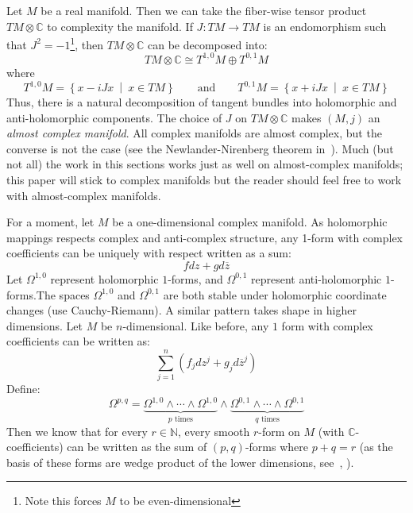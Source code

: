 \documentclass{book}
\newcommand{\N}{{\mathbb{N}}}
\newcommand{\C}{{\mathbb{C}}}
\newcommand{\set}[2]{\left\{#1 \ \middle|\ #2\right\}}
\begin{document}
Let $M$ be a real manifold. Then we can take the fiber-wise tensor product $TM\otimes \C$ to complexity the
manifold. If $J: TM \to TM$ is an endomorphism such that $J^2 = -1$\footnote{Note this forces $M$ to be
even-dimensional}, then $TM\otimes \C$ can be decomposed into:
\[
  TM\otimes \C \cong T^{1,0}M \oplus T^{0,1}M
\]
where
\[
  T^{1,0}M = \set{x-iJx}{x \in TM} \qquad \text{and} \qquad T^{0,1}M =\set{x+iJx}{x \in TM}
\]
Thus, there is a natural decomposition of tangent bundles into holomorphic and anti-holomorphic components.
The choice of $J$ on $TM\otimes \C$ makes $(M,j)$ an \emph{almost complex manifold}. All complex manifolds are
almost complex, but the converse is not the case (see the Newlander-Nirenberg theorem
in~\cite{HodgeTheory2014}). Much (but not all) the work in this sections works just as well on almost-complex
manifolds; this paper will stick to complex manifolds but the reader should feel free to work with
almost-complex manifolds.

For a moment, let $M$ be a one-dimensional complex manifold. As holomorphic mappings respects
complex and anti-complex structure, any 1-form with complex coefficients can be uniquely with respect written
as a sum:
\[
   fdz + gd\overline{z}
\]
Let $\Omega^{1,0}$ represent holomorphic $1$-forms, and $\Omega^{0,1}$ represent anti-holomorphic
$1$-forms.The spaces $\Omega^{1,0}$ and $\Omega^{0,1}$ are both stable under holomorphic coordinate
changes (use Cauchy-Riemann). A similar pattern takes shape in higher dimensions. Let $M$ be $n$-dimensional. Like before, any $1$ form with
complex coefficients can be written as:
\[
  \sum_{j=1}^n (f_jdz^{j} + g_jd\overline{z}^j)
\]
Define:
\[
  \Omega^{p,q} = \underbrace{\Omega^{1,0} \wedge \cdots \wedge \Omega^{1,0}}_{\text{$p$ times}}\wedge \underbrace{\Omega^{0,1} \wedge \cdots \wedge \Omega^{0,1}}_{\text{$q$ times}}
\]
Then we know that for every $r \in \N$, every smooth $r$-form on $M$ (with $\C$-coefficients) can be written
as the sum of $(p,q)$-forms where $p+q = r$ (as the basis of these forms are wedge product of the lower
dimensions, see~\cite{NateDiffGeo}, \cite{NateAlgTop}).
\end{document}

